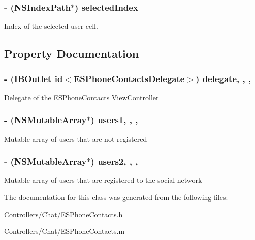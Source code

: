 \subsubsection[{selected\+Index}]{\setlength{\rightskip}{0pt plus 5cm}-\/ (N\+S\+Index\+Path$\ast$) selected\+Index\hspace{0.3cm}{\ttfamily [protected]}}\label{interface_e_s_phone_contacts_a94b55ed8d3ab31d45bd39cb4ad120e08}
Index of the selected user cell. 

\subsection{Property Documentation}
\hypertarget{interface_e_s_phone_contacts_a8794cdc4441eb885facd7a4f01e23ad3}{}
\subsubsection[{delegate}]{\setlength{\rightskip}{0pt plus 5cm}-\/ (I\+B\+Outlet id$<${\bf E\+S\+Phone\+Contacts\+Delegate}$>$) delegate\hspace{0.3cm}{\ttfamily [read]}, {\ttfamily [write]}, {\ttfamily [nonatomic]}, {\ttfamily [assign]}}\label{interface_e_s_phone_contacts_a8794cdc4441eb885facd7a4f01e23ad3}
Delegate of the \hyperlink{interface_e_s_phone_contacts}{E\+S\+Phone\+Contacts} View\+Controller \hypertarget{interface_e_s_phone_contacts_a57e8b65c0453b3846f101a0483f25a11}{}
\subsubsection[{users1}]{\setlength{\rightskip}{0pt plus 5cm}-\/ (N\+S\+Mutable\+Array$\ast$) users1\hspace{0.3cm}{\ttfamily [read]}, {\ttfamily [write]}, {\ttfamily [nonatomic]}, {\ttfamily [strong]}}\label{interface_e_s_phone_contacts_a57e8b65c0453b3846f101a0483f25a11}
Mutable array of users that are not registered \hypertarget{interface_e_s_phone_contacts_aaf714ab9942fdca5066c2fc1682be314}{}
\subsubsection[{users2}]{\setlength{\rightskip}{0pt plus 5cm}-\/ (N\+S\+Mutable\+Array$\ast$) users2\hspace{0.3cm}{\ttfamily [read]}, {\ttfamily [write]}, {\ttfamily [nonatomic]}, {\ttfamily [strong]}}\label{interface_e_s_phone_contacts_aaf714ab9942fdca5066c2fc1682be314}
Mutable array of users that are registered to the social network 

The documentation for this class was generated from the following files\+:\begin{DoxyCompactItemize}
\item 
Controllers/\+Chat/E\+S\+Phone\+Contacts.\+h\item 
Controllers/\+Chat/E\+S\+Phone\+Contacts.\+m\end{DoxyCompactItemize}
